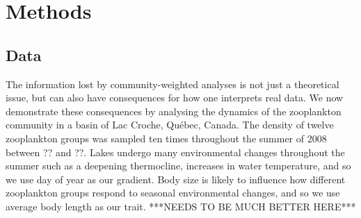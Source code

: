 \documentclass[12pt]{ecology}
\begin{document}

\section{Methods}

\subsection{Data}

The information lost by community-weighted analyses is not just a theoretical issue, but can also have consequences for how one interprets real data.  We now demonstrate these consequences by analysing the dynamics of the zooplankton community in a basin of Lac Croche, Qu\'{e}bec, Canada.  The density of twelve zooplankton groups was sampled ten times throughout the summer of 2008 between ?? and ??.  Lakes undergo many environmental changes throughout the summer such as a deepening thermocline, increases in water temperature, and so we use day of year as our gradient.  Body size is likely to influence how different zooplankton groups respond to seasonal environmental changes, and so we use average body length as our trait.  ***NEEDS TO BE MUCH BETTER HERE***
\end{document}
